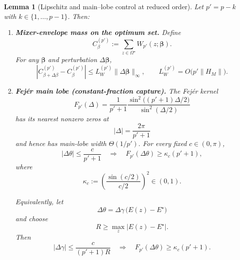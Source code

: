 \documentclass[10pt,a4paper]{amsart}
\newtheorem{lemma}{Lemma}
\begin{document}
\begin{lemma}[Lipschitz and main--lobe control at reduced order]
\label{lem:lip-reduced}
Let \(p'=p-k\) with \(k\in\{1,\dots,p-1\}\). Then:
\begin{enumerate}[leftmargin=1.5em]

\item \textbf{Mixer-envelope mass on the optimum set.}
Define
\[
C_{\beta}^{(p')}
:=
\sum_{z\in\Omega^\star}
W_{p'}(z;\boldsymbol\beta).
\]
For any \(\boldsymbol\beta\) and perturbation
\(\Delta\boldsymbol\beta\),
\[
\left|
C_{\beta+\Delta\beta}^{(p')}
-
C_{\beta}^{(p')}
\right|
\le
L_W^{(p')}
\|\Delta\boldsymbol\beta\|_\infty,
\qquad
L_W^{(p')}
=
O\!\bigl(p'\|H_M\|\bigr).
\]

\item \textbf{Fej\'er main lobe (constant-fraction capture).}
The Fej\'er kernel
\[
F_{p'}(\Delta)
=
\frac{1}{p'+1}
\frac{
\sin^2\!\bigl((p'+1)\Delta/2\bigr)
}{
\sin^2(\Delta/2)
}
\]
has its nearest nonzero zeros at
\[
|\Delta|
=
\frac{2\pi}{p'+1}
\]
and hence has main-lobe width \(\Theta(1/p')\). For every fixed
\(c\in(0,\pi)\),
\[
|\Delta\theta|
\le
\frac{c}{p'+1}
\quad\Longrightarrow\quad
F_{p'}(\Delta\theta)
\ge
\kappa_c(p'+1),
\]
where
\[
\kappa_c
:=
\left(
\frac{\sin(c/2)}{c/2}
\right)^2
\in(0,1).
\]

Equivalently, let
\[
\Delta\theta
=
\Delta\gamma\,
\bigl(E(z)-E^\star\bigr)
\]
and choose
\[
R
\ge
\max_z
\bigl|E(z)-E^\star\bigr|.
\]
Then
\[
|\Delta\gamma|
\le
\frac{c}{(p'+1)R}
\quad\Longrightarrow\quad
F_{p'}(\Delta\theta)
\ge
\kappa_c(p'+1).
\]

\end{enumerate}
\end{lemma}
\end{document}
